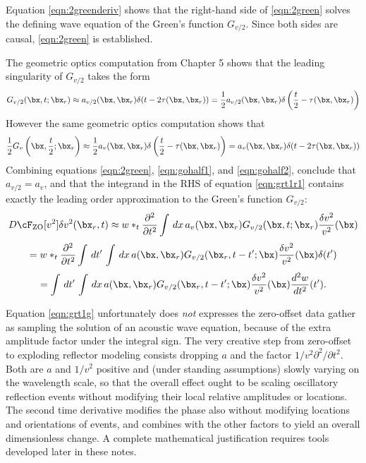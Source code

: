 Equation \ref{eqn:2greenderiv} shows that the right-hand side of \ref{eqn:2green} solves the defining wave equation of the Green's function $G_{v/2}$. Since both sides are causal, \ref{eqn:2green} is established. 

The geometric optics computation from Chapter 5 shows that the leading singularity of $G_{v/2}$ takes the form
\begin{equation}
\label{eqn:gohalf1}
G_{v/2}(\bx,t;\bx_r) \approx a_{v/2}(\bx,\bx_r)\delta(t-2\tau(\bx,\bx_r)) = \frac{1}{2}a_{v/2}(\bx,\bx_r)\delta\left(\frac{t}{2}-\tau(\bx,\bx_r)\right)
\end{equation}
However the same geometric optics computation shows that
\begin{equation}
\label{eqn:gohalf2}
\frac{1}{2}G_v\left(\bx,\frac{t}{2};\bx_r\right) \approx \frac{1}{2}a_{v}(\bx,\bx_r)\delta\left(\frac{t}{2}-\tau(\bx,\bx_r)\right)
 =a_v(\bx,\bx_r)\delta(t-2\tau(\bx,\bx_r)) 
\end{equation}
Combining equations \ref{eqn:2green}, \ref{eqn:gohalf1}, and \ref{eqn:gohalf2}, conclude that $a_{v/2} = a_v$, and that the integrand in the RHS of equation \ref{eqn:grt1r1} contains exactly the leading order approximation to the Green's function $G_{v/2}$:
\[
D\cF_{\rm ZO}[v^2]\delta v^2(\bx_r,t) \approx  w*_t \frac{\partial^2}{\partial t^2}\int \, dx \,a_v(\bx,\bx_r) G_{v/2}(\bx,t;\bx_r) \frac{\delta v^2}{v^2}(\bx) 
\]
\[
= w*_t \frac{\partial^2}{\partial t^2}\int\, dt'\,\int \, dx \, a(\bx,\bx_r)G_{v/2}(\bx_r,t-t';\bx) \frac{\delta v^2}{v^2}(\bx) 
\delta(t')
\]
\begin{equation}
\label{eqn:grt1g}
= \int\, dt'\,\int \, dx \, a(\bx,\bx_r)G_{v/2}(\bx_r,t-t';\bx) \frac{\delta v^2}{v^2}(\bx)\frac{d^2w}{dt^2}(t').
\end{equation}

Equation \ref{eqn:grt1g} unfortunately does {\em not} expresses the zero-offset data gather as sampling the solution of an acoustic wave equation, because of the extra amplitude factor under the integral sign. 
The very creative step from zero-offset to exploding reflector modeling consists dropping $a$ and the factor $1/v^2\partial^2/\partial t^2$. Both are $a$ and $1/v^2$ positive and (under standing assumptions) slowly varying on the wavelength scale, so that the overall effect ought to be scaling oscillatory reflection events without modifying their local relative amplitudes or locations. The second time derivative modifies the phase also without modifying locations and orientations of events, and combines with the other factors to yield an overall dimensionless change. A complete mathematical justification requires tools developed later in these notes.

